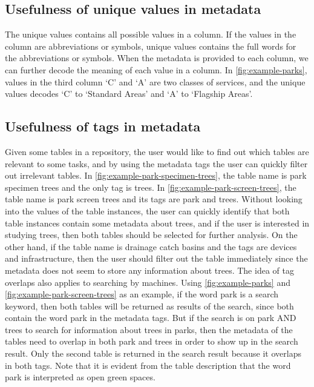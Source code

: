 \subsection{Usefulness of unique values in metadata}

The unique values contains all possible values in a column. If the values in the column are abbreviations or symbols, unique values contains the full words for the abbreviations or symbols.
When the metadata is provided to each column, we can further decode the meaning of each value in a column. In \autoref{fig:example-parks}, values in the third column ‘C’ and ‘A’ are two classes of services, and the unique values decodes ‘C’ to ‘Standard Areas’ and ‘A’ to ‘Flagship Areas’.

\subsection{Usefulness of tags in metadata}
Given some tables in a repository, the user would like to find out which tables are relevant to some tasks, and by using the metadata tags the user can quickly filter out irrelevant tables. In \autoref{fig:example-park-specimen-trees}, the table name is park specimen trees and the only tag is trees. In \autoref{fig:example-park-screen-trees}, the table name is park screen trees and its tags are park and trees. Without looking into the values of the table instances, the user can quickly identify that both table instances contain some metadata about trees, and if the user is interested in studying trees, then both tables should be selected for further analysis. On the other hand, if the table name is drainage catch basins and the tags are devices and infrastructure, then the user should filter out the table immediately since the metadata does not seem to store any information about trees.
The idea of tag overlaps also applies to searching by machines. Using \autoref{fig:example-parks} and \autoref{fig:example-park-screen-trees} as an example, if the word park is a search keyword, then both tables will be returned as results of the search, since both contain the word park in the metadata tags. But if the search is on park AND trees to search for information about trees in parks, then the metadata of the tables need to overlap in both park and trees in order to show up in the search result. Only the second table is returned in the search result because it overlaps in both tags. Note that it is evident from the table description that the word park is interpreted as open green spaces.

